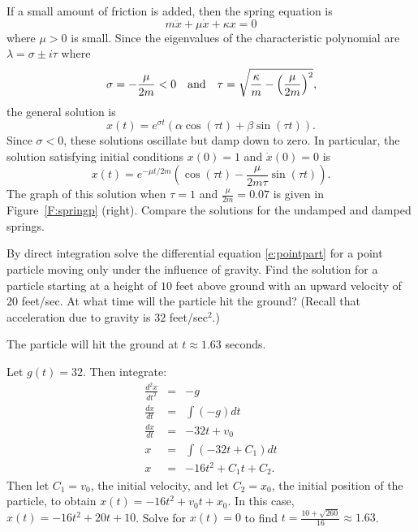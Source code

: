 \documentclass{ximera}
\begin{document}
If a small amount of friction is added, then the spring equation is
\[
m\ddot{x} + \mu \dot{x} +\kappa x = 0
\]
where $\mu>0$ is small.  Since the eigenvalues of the characteristic
polynomial are $\lambda=\sigma\pm i\tau$ where
\[
\sigma = -\frac{\mu}{2m} < 0 \quad\mbox{and}\quad \tau =\sqrt{\frac{\kappa}{m}
-\left(\frac{\mu}{2m}\right)^2},
\]
the general solution is
\[
x(t) = e^{\sigma t}(\alpha\cos(\tau t) + \beta\sin(\tau t)).
\]
Since $\sigma<0$, these solutions oscillate but damp down to zero.  In
particular, the solution satisfying initial conditions $x(0)=1$ and
$\dot{x}(0)=0$ is
\[
x(t) = e^{-\mu t/2m}
\left(\cos(\tau t)-\frac{\mu}{2m\tau}\sin(\tau t)\right).
\]
The graph of this solution when $\tau=1$ and $\frac{\mu}{2m}=0.07$ is
given in Figure~\ref{F:springp} (right).  Compare the solutions for the
undamped and damped springs.

\EXER

\TEXER

\begin{exercise} \label{c6.7.1}
By direct integration solve the differential equation \eqref{e:pointpart}
for a point particle moving only under the influence of gravity.  Find the
solution for a particle starting at a height of $10$ feet above ground with
an upward velocity of $20$ feet/sec.  At what time will the particle hit
the ground?  (Recall that acceleration due to gravity is $32$ feet/sec$^2$.)

\begin{solution}

\ans The particle will hit the ground at $t \approx 1.63$ seconds.

\soln Let $g(t) = 32$.  Then integrate:
\[
\begin{array}{rcl}
\frac{d^2x}{dt^2} & = & -g \\
\frac{dx}{dt} & = & \int (-g)dt \\
\frac{dx}{dt} & = & -32t + v_0 \\
x & = & \int (-32t + C_1)dt \\
x & = & -16t^2 + C_1t + C_2.
\end{array}
\]
Then let $C_1 = v_0$, the initial velocity, and let $C_2 = x_0$, the initial
position of the particle, to obtain $x(t) = -16t^2 + v_0t + x_0$.  In this
case, $x(t) = -16t^2 + 20t + 10$.  Solve for $x(t) = 0$ to find
$t = \frac{10 + \sqrt{260}}{16} \approx 1.63$.

\end{solution}
\end{exercise}
\end{document}
